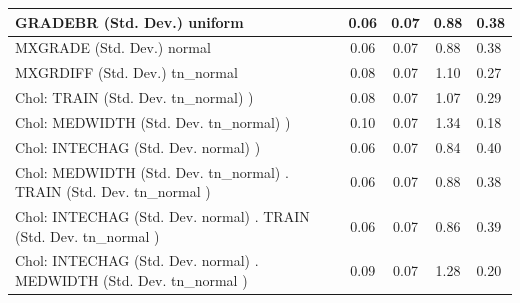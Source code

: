 \begin{table}
\begin{center}
\begin{tabular}{|l|l|c|c|c|l|}
			\hline
			GRADEBR (Std. Dev.) uniform &  & 0.06 & 0.07 & 0.88 & 0.38 \\
			\hline
			MXGRADE (Std. Dev.) normal &  & 0.06 & 0.07 & 0.88 & 0.38 \\
			\hline
			MXGRDIFF (Std. Dev.) tn_normal &  & 0.08 & 0.07 & 1.10 & 0.27 \\
			\hline
			 Chol: TRAIN (Std. Dev. tn_normal) ) &  & 0.08 & 0.07 & 1.07 & 0.29 \\
			\hline
			 Chol: MEDWIDTH (Std. Dev. tn_normal) ) &  & 0.10 & 0.07 & 1.34 & 0.18 \\
			\hline
			 Chol: INTECHAG (Std. Dev. normal) ) &  & 0.06 & 0.07 & 0.84 & 0.40 \\
			\hline
			 Chol: MEDWIDTH (Std. Dev. tn_normal) . TRAIN (Std. Dev.   tn_normal ) &  & 0.06 & 0.07 & 0.88 & 0.38 \\
			\hline
			 Chol: INTECHAG (Std. Dev. normal) . TRAIN (Std. Dev.   tn_normal ) &  & 0.06 & 0.07 & 0.86 & 0.39 \\
			\hline
			 Chol: INTECHAG (Std. Dev. normal) . MEDWIDTH (Std. Dev.   tn_normal ) &  & 0.09 & 0.07 & 1.28 & 0.20 \\
			\hline
		\end{tabular}
	\end{center}
\end{table}